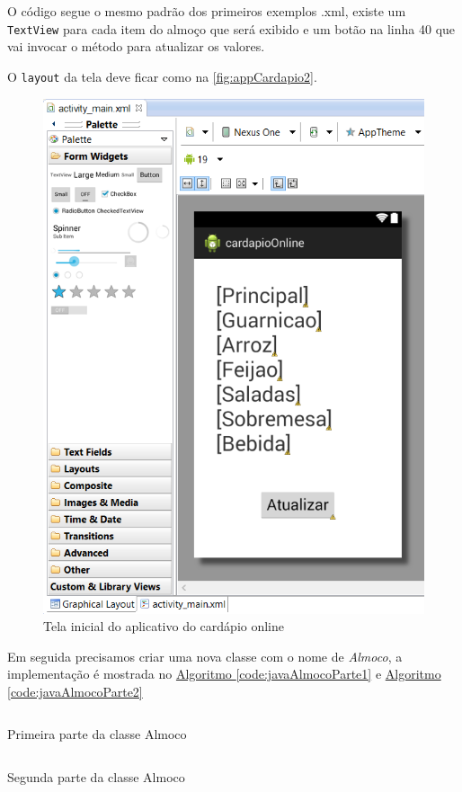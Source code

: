 \documentclass[a4paper,12pt,brazil,oneside]{book}
\begin{document}
O código segue o mesmo padrão dos primeiros exemplos .xml, existe um \texttt{TextView} para cada item do almoço que será exibido e um botão na linha 40 que vai invocar o método para atualizar os valores.

O \texttt{layout} da tela deve ficar como na \autoref{fig:appCardapio2}.

\begin{figure}[H]
  \centering
  \includegraphics[width=.75\textwidth]{figuras/devapp/cardapio/APP_Cardapio2.png}
  \caption{Tela inicial do aplicativo do cardápio online}
  \label{fig:appCardapio2}
\end{figure}

Em seguida precisamos criar uma nova classe com o nome de \emph{Almoco}, a implementação é mostrada no \hyperref[code:javaAlmocoParte1]{Algoritmo \ref*{code:javaAlmocoParte1}} e \hyperref[code:javaAlmocoParte2]{Algoritmo \ref*{code:javaAlmocoParte2}}

\begin{listing}[H]
	\inputminted[linenos=true,fontsize=\small,frame=lines, framesep=2mm, tabsize=2,numbersep=5pt]{xml}{src/devapp/cardapio/AlmocoParte1.java}
	\caption{Primeira parte da classe Almoco}
	\label{code:javaAlmocoParte1}
	\end{listing}
	
\begin{listing}[H]
	\inputminted[linenos=true,fontsize=\small,frame=lines, framesep=2mm, tabsize=2,numbersep=5pt]{xml}{src/devapp/cardapio/AlmocoParte2.java}
	\caption{Segunda parte da classe Almoco}
	\label{code:javaAlmocoParte2}
	\end{listing}
	
\end{document}
